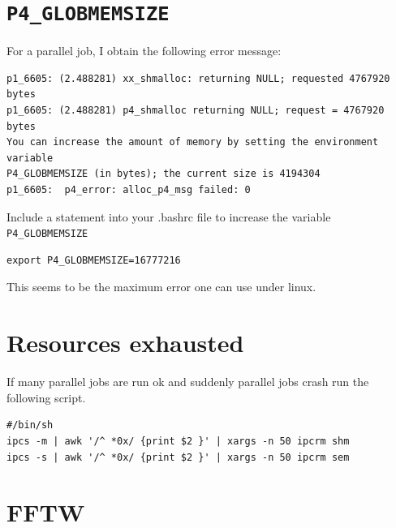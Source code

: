 \documentclass[a4paper,10pt]{report}
\newcommand{\mytt}[1]{{\tt #1}}
\begin{document}
\section{\mytt{P4\_GLOBMEMSIZE}}
For a parallel job, I obtain the following error message:
\begin{verbatim}
p1_6605: (2.488281) xx_shmalloc: returning NULL; requested 4767920 bytes
p1_6605: (2.488281) p4_shmalloc returning NULL; request = 4767920 bytes
You can increase the amount of memory by setting the environment variable
P4_GLOBMEMSIZE (in bytes); the current size is 4194304
p1_6605:  p4_error: alloc_p4_msg failed: 0
\end{verbatim}

Include a statement into your .bashrc file to increase the variable
\mytt{P4\_GLOBMEMSIZE}
\begin{verbatim}
export P4_GLOBMEMSIZE=16777216
\end{verbatim}
This seems to be the maximum error one can use under linux.


\section{Resources exhausted}
If many parallel jobs are run ok and suddenly parallel jobs crash run the following script.
\begin{verbatim}
#/bin/sh
ipcs -m | awk '/^ *0x/ {print $2 }' | xargs -n 50 ipcrm shm
ipcs -s | awk '/^ *0x/ {print $2 }' | xargs -n 50 ipcrm sem
\end{verbatim}

\section{FFTW}
\end{document}
